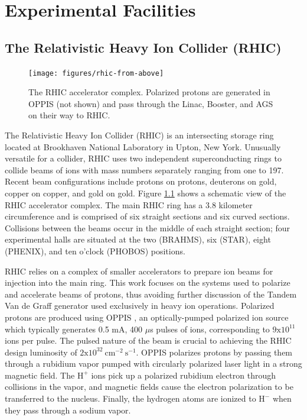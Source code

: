 \chapter{Experimental Facilities}

\section{The Relativistic Heavy Ion Collider (RHIC)}

\begin{figure}
  \begin{center}
    \texttt{[image: figures/rhic-from-above]}
  \end{center}
  \caption{The RHIC accelerator complex. Polarized protons are generated in
  OPPIS (not shown) and pass through the Linac, Booster, and AGS on their way
  to RHIC.}
  \label{fig:rhic}
\end{figure}

The Relativistic Heavy Ion Collider (RHIC) is an intersecting storage ring
located at Brookhaven National Laboratory in Upton, New York. Unusually
versatile for a collider, RHIC uses two independent superconducting rings to
collide beams of ions with mass numbers separately ranging from one to 197.
Recent beam configurations include protons on protons, deuterons on gold,
copper on copper, and gold on gold. Figure \ref{fig:rhic} shows a schematic
view of the RHIC accelerator complex. The main RHIC ring has a 3.8 kilometer
circumference and is comprised of six straight sections and six curved
sections. Collisions between the beams occur in the middle of each straight
section; four experimental halls are situated at the two (BRAHMS), six (STAR),
eight (PHENIX), and ten o'clock (PHOBOS) positions.

RHIC relies on a complex of smaller accelerators to prepare ion beams for
injection into the main ring. This work focuses on the systems used to
polarize and accelerate beams of protons, thus avoiding further discussion of
the Tandem Van de Graff generator used exclusively in heavy ion operations.
Polarized protons are produced using OPPIS \cite{Zelenski:2002gb,
Zelenski:2008zza}, an optically-pumped polarized ion source which typically
generates 0.5 mA, 400 $\mu$s pulses of ions, corresponding to
$\mathrm{9x10^{11}}$ ions per pulse. The pulsed nature of the beam is crucial
to achieving the RHIC design luminosity of
$\mathrm{2x10^{32}~cm^{-2}~s^{-1}}$. OPPIS polarizes protons by passing them
through a rubidium vapor pumped with circularly polarized laser light in a
strong magnetic field. The $\mathrm{H^+}$ ions pick up a polarized rubidium
electron through collisions in the vapor, and magnetic fields cause the
electron polarization to be transferred to the nucleus. Finally, the hydrogen
atoms are ionized to $\mathrm{H^-}$ when they pass through a sodium vapor.

